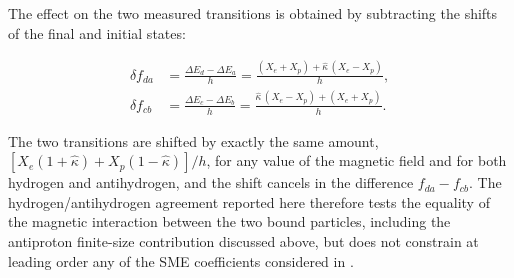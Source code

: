 The effect on the two measured transitions is obtained by subtracting the shifts of the final and initial states:

\begin{align}
\delta f_{da} &= \frac{\Delta E_d - \Delta E_a}{h} = \frac{(X_e + X_p) + \hat\kappa\,(X_e - X_p)}{h}, \nonumber \\
\delta f_{cb} &= \frac{\Delta E_c - \Delta E_b}{h} = \frac{\hat\kappa\,(X_e - X_p) + (X_e + X_p)}{h}.
\label{eq:SMEfcbfda}
\end{align}

The two transitions are shifted by exactly the same amount, $[X_e(1+\hat\kappa) + X_p(1-\hat\kappa)]/h$, for any value of the magnetic field and for both hydrogen and antihydrogen, and the shift cancels in the difference $f_{da} - f_{cb}$. 
The hydrogen/antihydrogen agreement reported here therefore tests the equality of the magnetic interaction between the two bound particles, including the antiproton finite-size contribution discussed above, but does not constrain at leading order any of the SME coefficients considered in \cite{Bluhm_1999,Kostelecky:2015nma}.

